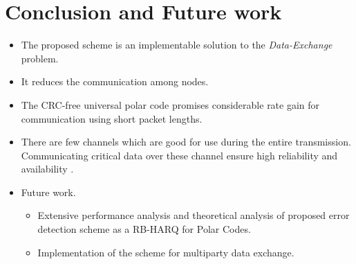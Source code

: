 \documentclass[
11pt, %
a4paper, %
oneside, %
headinclude,footinclude, %
BCOR5mm, %
]{scrartcl}
\begin{document}
\section{Conclusion and Future work}\label{future}
\begin{itemize}
\item The proposed scheme is an implementable solution to the \emph{Data-Exchange} problem.
\item It reduces the communication among nodes.
\item The CRC-free universal polar code promises considerable rate gain for communication using short packet lengths. 
\item There are few channels which are good for use during the entire transmission. Communicating critical data over these channel ensure high reliability and availability . 
\end{itemize}
\begin{itemize}
\item Future work.
\begin{itemize}
\item Extensive performance analysis and theoretical analysis of proposed error detection scheme as a RB-HARQ for Polar Codes.
\item Implementation of the scheme for multiparty data exchange.
\end{itemize}
\end{itemize}




\clearpage
\renewcommand{\refname}{\spacedlowsmallcaps{References}} %




\end{document}
